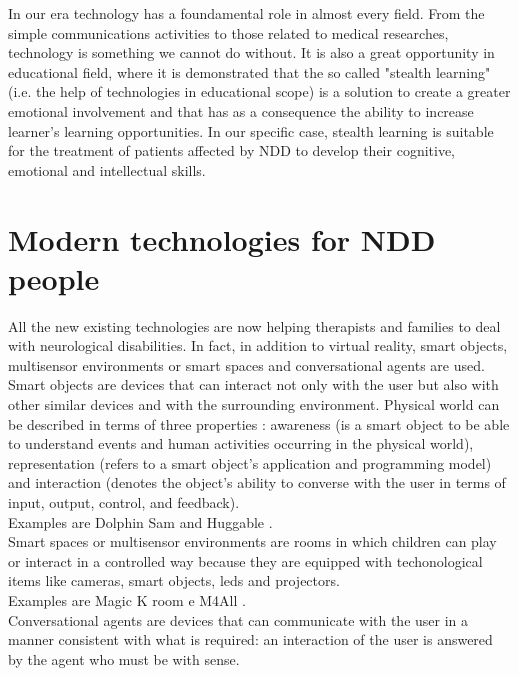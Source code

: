 In our era technology has a foundamental role in almost every field. From the simple communications activities to those related to medical researches, technology is something we cannot do without. It is also a great opportunity in educational field, where it is demonstrated that the so called "stealth learning" (i.e. the help of technologies in educational scope) \cite{Sharp} is a solution to create a greater emotional involvement and that has as a consequence the ability to increase learner's learning opportunities. In our specific case, stealth learning is suitable for the treatment of patients affected by NDD to develop their cognitive, emotional and intellectual skills.

\section{Modern technologies for NDD people}
All the new existing technologies are now helping therapists and families to deal with neurological disabilities. In fact, in addition to virtual reality, smart objects, multisensor environments or smart spaces and conversational agents are used.\\
Smart objects are devices that can interact not only with the user but also with other similar devices and with the surrounding environment. Physical world can be described in terms of three properties \cite{Smart}: awareness (is a smart object to be able to understand events and human activities occurring in the physical world), representation (refers to a smart object's application and programming model) and interaction (denotes the object's ability to converse with the user in terms of input, output, control, and feedback).\\
Examples are Dolphin Sam \cite{Dolphin} and  Huggable \cite{Huggable}. \\
Smart spaces or multisensor environments are rooms in which children can play or interact in a controlled way because they are equipped with techonological items like cameras, smart objects, leds and projectors.
\\
Examples are Magic K room e M4All \cite{M4all}. \\
Conversational agents are devices that can communicate with the user in a manner consistent with what is required: an interaction of the user is answered by the agent who must be with sense.\\
